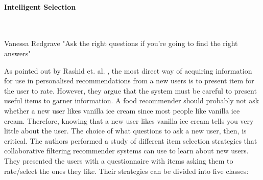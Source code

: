 

\paragraph{Intelligent Selection}\mbox{}\\


\begin{chapquote}[30pt]{Vanessa Redgrave}
  "Ask the right questions if you're going to find the right answers"
\end{chapquote}

As pointed out by Rashid et. al. \cite{Rashid2002}, the most direct way of
acquiring information for use in personalised recommendations from a new users
is to present item for the user to rate. However, they argue that the system
must be careful to present useful items to garner information. A food
recommender should probably not ask whether a new user likes vanilla ice cream
since most people like vanilla ice cream. Therefore, knowing that a new user
likes vanilla ice cream tells you very little about the user. The choice of
what questions to ask a new user, then, is critical. The authors performed a
study of different item selection strategies that collaborative filtering
recommender systems can use to learn about new users. They presented the users
with a questionnaire with items asking them to rate/select the ones they like.
Their strategies can be divided into five classes:

